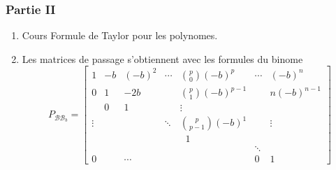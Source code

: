 \subsubsection*{Partie II}
\begin{enumerate}
\item Cours Formule de Taylor pour les polynomes.
\item  Les matrices de passage s'obtiennent avec les formules du binome
\begin{displaymath}
P_{\mathcal{B}\mathcal{B}_b}=
\left[ 
\begin{array}{ccccccc}
1      & -b & (-b)^2 & \cdots & \binom{p}{0}(-b)^p     & \cdots & (-b)^n \\ 
0      & 1  & -2b    &        & \binom{p}{1}(-b)^{p-1} &        & n(-b)^{n-1} \\ 
       & 0  & 1      &        & \vdots                 &        &  \\ 
\vdots &    &        & \ddots & \binom{p}{p-1}(-b)^1   &        & \vdots \\ 
       &    &        &        & \; \; 1                &        &  \\ 
       &    &        &        &                        & \ddots &  \\ 
0      &    & \cdots &        &                        & 0      & 1
\end{array}
\right] 
\end{displaymath}


\end{enumerate}
